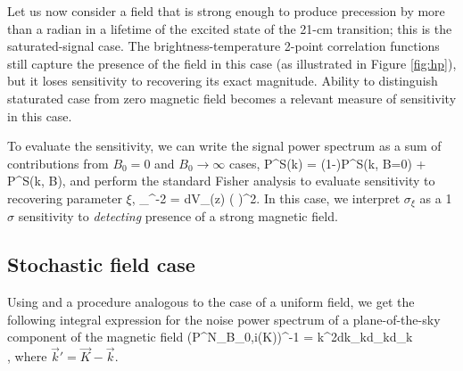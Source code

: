 Let us now consider a field that is strong enough to produce precession by more than a radian in a lifetime of the excited state of the 21-cm transition; this is the saturated-signal case. The brightness-temperature 2-point correlation functions still capture the presence of the field in this case (as illustrated in Figure \ref{fig:hp}), but it loses sensitivity to recovering its exact magnitude. Ability to distinguish staturated case from zero magnetic field becomes a relevant measure of sensitivity in this case. 

To evaluate the sensitivity, we can write the signal power spectrum as a sum of contributions from $B_0=0$ and $B_0\to\infty$ cases, 
\beq
P^S(\vec k) = (1-\xi)P^S(\vec k, B=0) + \xi P^S(\vec k, B\to \infty),
\label{eq:saturated_P}
\eeq
and perform the standard Fisher analysis to evaluate sensitivity to recovering parameter $\xi$,
\beq
\bga
\sigma_{\xi}^{-2} = 
\int dV_\mathrm{}(z)
\left(  \right)^2. 
\ega
\label{eq:sigma_xi}
\eeq
In this case, we interpret $\sigma_\xi$ as a 1$\sigma$ sensitivity to \textit{detecting} presence of a strong magnetic field.

\subsection{Stochastic field case}
\label{subsec:stochastic_fisher}

Using \eq{\ref{eq:NK}} and a procedure analogous to the case of a uniform field, we get the following integral expression for the noise power spectrum of a plane-of-the-sky component of the magnetic field 
\beq
\bga
\left(P^N_{B_{0,i}}(\vec K)\right)^{-1} = \int k^2d{k}\sin \theta_kd\theta_kd\phi_k \\
\times{} ,
\ega
\label{eq:NK2}
\eeq
where $\vec k'=\vec K -\vec k$.

